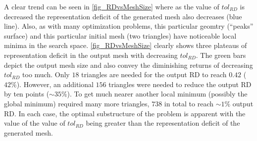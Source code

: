 A clear trend can be seen in \ref{fig_RDvsMeshSize} where as the value
of $tol_{RD}$ is decreased the representation deficit of the generated
mesh also decreases (blue line). Also, as with many optimization
problems, this particular geomtry (``peaks'' surface) and this
particular initial mesh (two triangles) have noticeable local minima in
the search space. \ref{fig_RDvsMeshSize} clearly shows three plateaus of
representation deficit in the output mesh with decreasing $tol_{RD}$.
The green bars depict the output mesh size and also convey the
diminishing returns of decreasing $tol_{RD}$ too much. Only $18$
triangles are needed for the output RD to reach $0.42$ ($42\%$).
However, an additional $156$ triangles were needed to reduce the output
RD by ten points ($\sim 35\%$). To get much nearer another local
minimum (possibly the global minimum) required many more triangles,
$738$ in total to reach $\sim 1\%$ output RD. In each case, the
optimal substructure of the problem is apparent with the value of the
value of $tol_{RD}$ being greater than the representation deficit of
the generated mesh.

